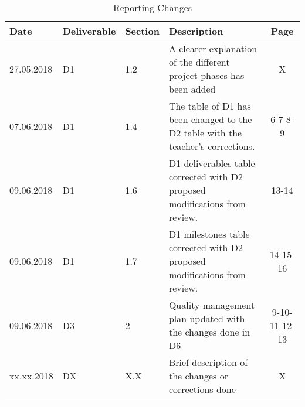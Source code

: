 \begin{longtable}[H]{l l l p{7cm} c}
	
	\toprule[2pt]
	
	\textbf{Date} & \textbf{Deliverable} & \textbf{Section} &  \textbf{Description} & \textbf{Page} \\
	
	\midrule[1.5pt] 
	\endhead
	
	27.05.2018 & D1 & 1.2  & A clearer explanation of the different project phases has been added & X \vspace{0.2cm} \\
	
	\midrule

	07.06.2018 & D1 & 1.4  & The table of D1 has been changed to the D2 table with the teacher's corrections. & 6-7-8-9 \vspace{0.2cm} \\
	
	\midrule

	09.06.2018 & D1 & 1.6  & D1 deliverables table corrected with D2 proposed modifications from review. & 13-14 \vspace{0.2cm} \\
	
	\midrule

	09.06.2018 & D1 & 1.7  & D1 milestones table corrected with D2 proposed modifications from review. & 14-15-16 \vspace{0.2cm} \\
	
	\midrule
		
	09.06.2018 & D3 & 2  & Quality management plan updated with the changes done in D6 & 9-10-11-12-13 \vspace{0.2cm} \\
	
	\midrule
	
	xx.xx.2018 & DX & X.X  & Brief description of the changes or corrections done & X \vspace{0.2cm} \\
	
	\bottomrule[2pt]
	
	\caption{Reporting Changes}
\end{longtable}

